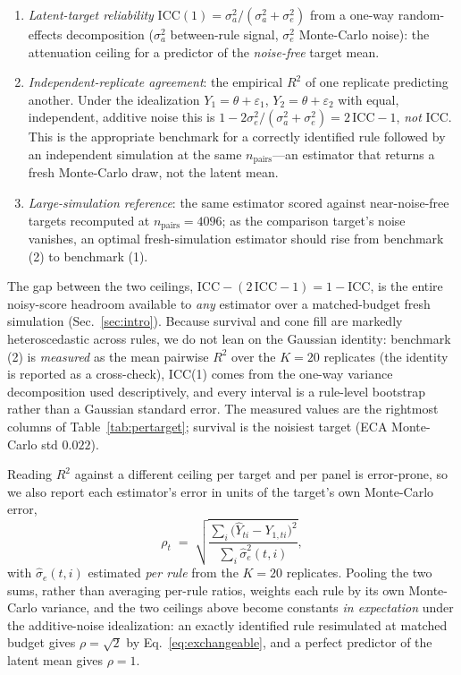 \documentclass[aip,cha,amsmath,amssymb,reprint,floatfix]{revtex4-2}
\newcommand{\rtwo}{$R^2$}
\begin{document}
\begin{enumerate}
\item \emph{Latent-target reliability} $\mathrm{ICC}(1)=\sigma_a^2 /
(\sigma_a^2+\sigma_e^2)$ from a one-way random-effects decomposition
($\sigma_a^2$ between-rule signal, $\sigma_e^2$ Monte-Carlo noise): the
attenuation ceiling for a predictor of the \emph{noise-free} target mean.
\item \emph{Independent-replicate agreement}: the empirical \rtwo{} of one
replicate predicting another. Under the idealization
$Y_1=\theta+\varepsilon_1$, $Y_2=\theta+\varepsilon_2$ with equal,
independent, additive noise this is
$1-2\sigma_e^2/(\sigma_a^2+\sigma_e^2)=2\,\mathrm{ICC}-1$, \emph{not} ICC.
This is the appropriate benchmark for a correctly identified rule followed by
an independent simulation at the same $n_{\mathrm{pairs}}$---an estimator
that returns a fresh Monte-Carlo draw, not the latent mean.
\item \emph{Large-simulation reference}: the same estimator scored against
near-noise-free targets recomputed at $n_{\mathrm{pairs}}=4096$; as the
comparison target's noise vanishes, an optimal fresh-simulation estimator
should rise from benchmark (2) to benchmark (1).
\end{enumerate}

The gap between the two ceilings, $\mathrm{ICC}-(2\,\mathrm{ICC}-1) =
1-\mathrm{ICC}$, is the entire noisy-score headroom available to \emph{any}
estimator over a matched-budget fresh simulation (Sec.~\ref{sec:intro}).
Because survival and cone fill are markedly
heteroscedastic across rules, we do not lean on the Gaussian identity:
benchmark (2) is \emph{measured} as the mean pairwise \rtwo{} over the $K=20$
replicates (the identity is reported as a cross-check), ICC(1) comes from the
one-way variance decomposition used descriptively, and every interval is a
rule-level bootstrap rather than a Gaussian standard error. The measured
values are the rightmost columns of Table~\ref{tab:pertarget}; survival is the noisiest target (ECA Monte-Carlo std
$0.022$).

Reading \rtwo{} against a different ceiling per target and per panel is
error-prone, so we also report each estimator's error in units of the target's
own Monte-Carlo error,
\begin{equation}
\rho_t \;=\;
\sqrt{\frac{\sum_i\bigl(\hat Y_{ti}-Y_{1,ti}\bigr)^2}{\sum_i\hat\sigma_e^2(t,i)}},
\label{eq:rho}
\end{equation}
with $\hat\sigma_e(t,i)$ estimated \emph{per rule} from the $K=20$ replicates.
Pooling the two sums, rather than averaging per-rule ratios, weights each rule
by its own Monte-Carlo variance, and the two ceilings above become constants
\emph{in expectation} under the additive-noise idealization: an exactly
identified rule resimulated at matched budget gives $\rho=\sqrt2$ by
Eq.~\eqref{eq:exchangeable}, and a perfect predictor of the latent mean gives
$\rho=1$.
\end{document}
